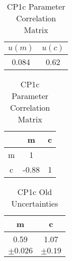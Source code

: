 \documentclass[12pt]{article}
\begin{document}
    \begin{table}[H]
        \begin{minipage}{0.5\textwidth}
            \centering
            \begin{tabular}{c c}
                \hline
                $u(m)$ & $u(c)$ \\
                \hline
                0.084 & 0.62 \\
                \hline
            \end{tabular}
            \caption{CP1c Unweighted Uncertainties of Parameters}
            \label{table:CP1c Unweighted Param Uncertainties}
        \end{minipage}
        \vspace{12pt}
        \begin{minipage}{0.5\textwidth}
            \centering
            \begin{tabular}{c c c}
                \hline
                & m & c \\
                \hline
                m & 1 \\
                c & -0.88 & 1 \\
            \end{tabular}
            \caption{CP1c Parameter Correlation Matrix}
            \label{table:CP1c Correlation Matrix}
        \end{minipage}
    \end{table}

    \begin{table}[H]
        \centering
        \begin{tabular}{cc}
            \hline
            m & c \\
            \hline
            0.59 & 1.07 \\
            $\pm0.026$ & $\pm0.19$ \\
            \hline
        \end{tabular}
        \caption{CP1c Old Uncertainties}
        \label{table:CP1c Old Uncertainties}
    \end{table}
\end{document}

